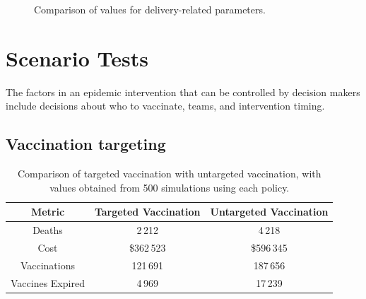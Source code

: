 \begin{figure}[ht!]{\textwidth}
{   \label{fig:res_secVehCap}
 } \vspace{1}
\label{fig:deliverySensitivity}
\caption{Comparison of values for delivery-related parameters.}
\end{figure}

\section{Scenario Tests}
\label{sec:res_scenTests}
The factors in an epidemic intervention that can be controlled by decision makers include decisions about who to vaccinate, teams, and intervention timing.

\subsection{Vaccination targeting}
\begin{table}[ht!]
\centering
\begin{tabular}{|c|c|c|}
\hline
\textbf{Metric}  & \multicolumn{1}{c|}{\textbf{Targeted Vaccination}} & \textbf{Untargeted Vaccination} \\ \hline
Deaths           & 2\,212                                             & 4\,218                          \\ \cline{1-1}
Cost             & \$362\,523                                         & \$596\,345                      \\ \cline{1-1}
Vaccinations     & 121\,691                                            & 187\,656                        \\ \cline{1-1}
Vaccines Expired & 4\,969                                             & 17\,239                         \\ \hline
\end{tabular}
\caption{Comparison of targeted vaccination with untargeted vaccination, with values obtained from 500 simulations using each policy.}
\label{tab:res_targetedVacc}
\end{table}

